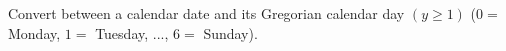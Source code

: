 Convert between a calendar date and its Gregorian calendar day $(y \ge 1)$ ($0 =$ Monday, $1 =$ Tuesday, $...$, $6 =$ Sunday).

\inputminted{cpp}{src/mathematics/computation/zellers-congruence.cpp.com}

